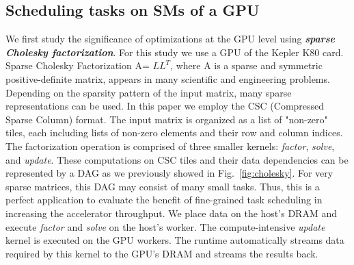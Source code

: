 \subsection{Scheduling tasks on SMs of a GPU}
We first study the significance of optimizations at the GPU level using {\em \bf sparse Cholesky factorization}.
For this study we use a GPU of the Kepler K80 card.
Sparse Cholesky Factorization A= $LL^T$, where A is a sparse and symmetric positive-definite matrix,
appears in many scientific and engineering problems.
Depending on the sparsity pattern of the input matrix, many sparse representations can be used.
In this paper we employ the CSC (Compressed Sparse Column) format. 
The input matrix is organized as a list of "non-zero" tiles, each including lists of non-zero elements and their row and column indices.
The factorization operation is comprised of three smaller kernels: {\em factor}, {\em solve}, and {\em update}.
These computations on CSC tiles and their data dependencies can be represented by a DAG as we previously showed in Fig.~\ref{fig:cholesky}. 
For very sparse matrices, this DAG may consist of many small tasks.
Thus, this is a perfect application to evaluate the benefit of fine-grained task scheduling in increasing the accelerator throughput.
We place data on the host's DRAM and execute {\em factor} and {\em solve} on the host's worker.
The compute-intensive {\em update} kernel is executed on the GPU workers.
The runtime automatically streams data required by this kernel to the GPU's DRAM and streams the results back.

